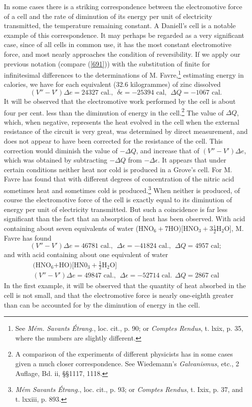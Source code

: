 \documentclass[12pt]{article}
\begin{document}
In some cases there is a striking correspondence between the electromotive force of a cell and the rate of diminution of its energy per unit of electricity transmitted, the temperature remaining constant. A Daniell's cell is a notable example of this correspondence. It may perhaps be regarded as a very significant case, since of all cells in common use, it has the most constant electromotive force, and most nearly approaches the condition of reversibility. If we apply our previous notation (compare (\ref{691})) with the substitution of finite for infinitesimal differences to the determinations of M. Favre,\footnote{See \textit{M\'{e}m. Savants \'{E}trang.}, loc. cit., p. 90; or \textit{Comptes Rendus}, t. lxix, p. 35, where the numbers are slightly different.} estimating energy in calories, we have for each equivalent (32.6 kilogrammes) of zinc dissolved
$$(V''- V') \Delta e= 24327 \text{ cal}., \ \  \delta \epsilon = - 25394\text{ cal}, \ \  \Delta Q= - 1067 \text{ cal}.$$
It will be observed that the electromotive work performed by the cell is about four per cent. less than the diminution of energy in the cell.\footnote{A comparison of the experiments of different physicists has in some cases given a much closer correspondence. See Wiedemann's \textit{Galvanismus}, etc., 2 Auflage, Bd. ii, \S\S 1117, 1118.} The value of $\Delta Q$, which, when negative, represents the heat evolved in the cell when the external resistance of the circuit is very great, was determined by direct measurement, and does not appear to have been corrected for the resistance of the cell. This correction would diminish the value of $-\Delta Q$, and increase that of $(V'' - V')\Delta e$, which was obtained by subtracting $-\Delta Q$ from $- \Delta \epsilon$.
It appears that under certain conditions neither heat nor cold is produced in a Grove's cell. For M. Favre has found that with different degrees of concentration of the nitric acid sometimes heat and sometimes cold is produced.\footnote{\textit{M\'{e}m Savants \'{E}trang.}, loc. cit., p. 93; or \textit{Comptes Rendus}, t. Ixix, p. 37, and t. lxxiii, p. 893.} When neither is produced, of course the electromotive force of the cell is exactly equal to its diminution of energy per unit of electricity transmitted. But such a coincidence is far less significant than the fact that an absorption of heat has been observed. With acid containing about seven equivalents of water (HNO$_6+7$HO)[HNO$_3+3\tfrac{1}{2}$H$_2$O], M. Favre has found
$$ (V''- V')\Delta e=46781 \text{ cal.},\ \  \Delta \epsilon=  -41824 \text{ cal.}, \ \ \Delta Q=4957\text{ cal};$$
and with acid containing about one equivalent of water
\begin{gather*}\text{(HNO$_6$+HO)[HN0$_3+\tfrac{1}{2}$H$_2$O]}\\
(V''- V')\Delta e=49847 \text{ cal.},\ \  \Delta \epsilon=  -52714 \text{ cal.} \ \ \Delta Q=2867\text{ cal} \end{gather*}
In the first example, it will be observed that the quantity of heat absorbed in the cell is not small, and that the electromotive force is nearly one-eighth greater than can be accounted for by the diminution of energy in the cell.
\end{document}
